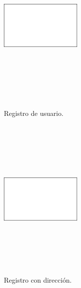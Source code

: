 \documentclass[a4paper, 12pt]{article}
\begin{document}
\begin{figure}[H]
   	\begin{minipage}{0.48\textwidth}
		\begin{center}
			{\includegraphics[height=8cm, width=4cm]{White.png}\par}
			\caption{Registro de usuario.}
			\medskip
		\end{center}  
	\end{minipage}\hfill
   	\begin{minipage}{0.48\textwidth}
		\begin{center}
			{\includegraphics[height=8cm, width=4cm]{White.png}\par}
			\caption{Registro con dirección.}
			\medskip
		\end{center}  
	\end{minipage}\hfill
\end{figure}
\end{document}
